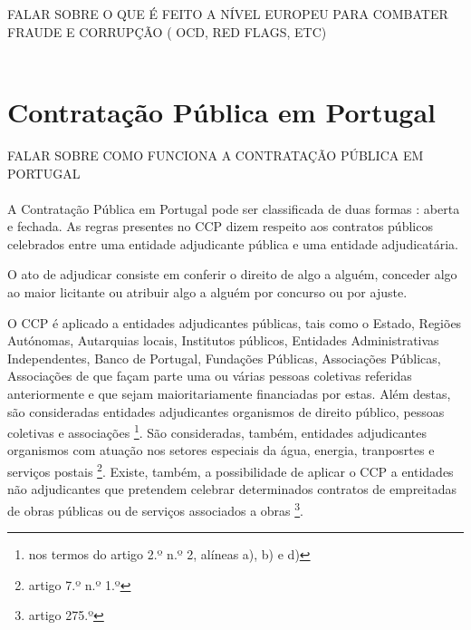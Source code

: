 FALAR SOBRE O QUE É FEITO A NÍVEL EUROPEU PARA COMBATER FRAUDE E CORRUPÇÃO ( OCD, RED FLAGS, ETC)
\\
\\


\section{Contratação Pública em Portugal}



FALAR SOBRE COMO FUNCIONA A CONTRATAÇÃO PÚBLICA EM PORTUGAL
\\
\\


A Contratação Pública em Portugal pode ser classificada de duas formas : aberta e fechada. As regras presentes no CCP dizem respeito aos contratos públicos celebrados entre uma entidade adjudicante pública e uma entidade adjudicatária.



O ato de adjudicar consiste em conferir o direito de algo a alguém, conceder algo ao maior licitante ou atribuir algo a alguém por concurso ou por ajuste. 

O CCP é aplicado a entidades adjudicantes públicas, tais como o Estado, Regiões Autónomas, Autarquias locais, Institutos públicos, Entidades Administrativas Independentes, Banco de Portugal, Fundações Públicas, Associações Públicas, Associações de que façam parte uma ou várias pessoas coletivas referidas anteriormente e que sejam maioritariamente financiadas por estas. Além destas, são consideradas entidades adjudicantes organismos de direito público, pessoas coletivas e associações \footnote{nos termos do artigo 2.º n.º 2, alíneas a), b) e d)}. São consideradas, também, entidades adjudicantes organismos com atuação nos setores especiais da água, energia, tranposrtes e serviços postais \footnote{artigo 7.º n.º 1.º}. Existe, também, a possibilidade de aplicar o CCP a entidades não adjudicantes que pretendem celebrar determinados contratos de empreitadas de obras públicas ou de serviços associados a obras \footnote{artigo 275.º}.



